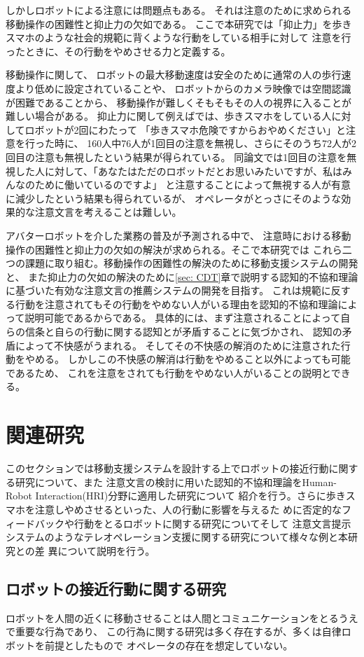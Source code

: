 \documentclass{kuisthesis}
\begin{document}
しかしロボットによる注意には問題点もある。
それは注意のために求められる移動操作の困難性と抑止力の欠如である。
ここで本研究では「抑止力」を歩きスマホのような社会的規範に背くような行動をしている相手に対して
注意を行ったときに、その行動をやめさせる力と定義する。

移動操作に関して、
ロボットの最大移動速度は安全のために通常の人の歩行速度より低めに設定されていることや、
ロボットからのカメラ映像では空間認識が困難であることから、
移動操作が難しくそもそもその人の視界に入ることが難しい場合がある。
抑止力に関して例えば\cite{Schneider2022}では、歩きスマホをしている人に対してロボットが2回にわたって
「歩きスマホ危険ですからおやめください」と注意を行った時に、
160人中76人が1回目の注意を無視し、さらにそのうち72人が2回目の注意も無視したという結果が得られている。
同論文では1回目の注意を無視した人に対して、「あなたはただのロボットだとお思いみたいですが、私はみんなのために働いているのですよ」
と注意することによって無視する人が有意に減少したという結果も得られているが、
オペレータがとっさにそのような効果的な注意文言を考えることは難しい。

アバターロボットを介した業務の普及が予測される中で、
注意時における移動操作の困難性と抑止力の欠如の解決が求められる。そこで本研究では
これら二つの課題に取り組む。移動操作の困難性の解決のために移動支援システムの開発と、
また抑止力の欠如の解決のために\ref{sec: CDT}章で説明する認知的不協和理論\cite{Festinger1957}に基づいた有効な注意文言の推薦システムの開発を目指す。
これは規範に反する行動を注意されてもその行動をやめない人がいる理由を認知的不協和理論によって説明可能であるからである。
具体的には、まず注意されることによって自らの信条と自らの行動に関する認知とが矛盾することに気づかされ、
認知の矛盾によって不快感がうまれる。
そしてその不快感の解消のために注意された行動をやめる。
しかしこの不快感の解消は行動をやめること以外によっても可能であるため、
これを注意をされても行動をやめない人がいることの説明とできる。
\section{関連研究}
このセクションでは移動支援システムを設計する上でロボットの接近行動に関する研究について、また
注意文言の検討に用いた認知的不協和理論をHuman-Robot Interaction(HRI)分野に適用した研究について
紹介を行う。さらに歩きスマホを注意しやめさせるといった、人の行動に影響を与えるた
めに否定的なフィードバックや行動をとるロボットに関する研究についてそして
注意文言提示システムのようなテレオペレーション支援に関する研究について様々な例と本研究との差
異について説明を行う。
\subsection{ロボットの接近行動に関する研究}
ロボットを人間の近くに移動させることは人間とコミュニケーションをとるうえで重要な行為であり、
この行為に関する研究は多く存在するが、多くは自律ロボットを前提としたもので
オペレータの存在を想定していない。
\end{document}

